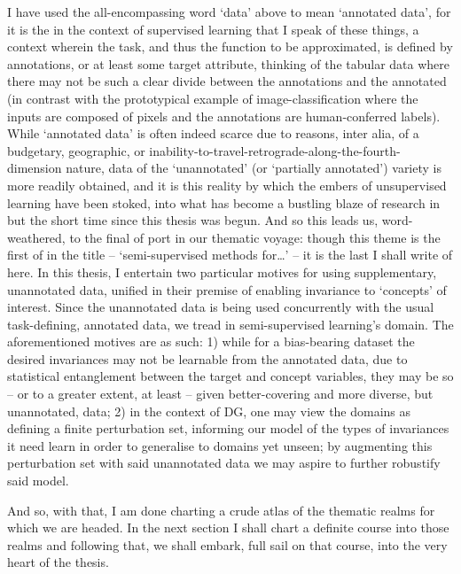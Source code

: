 %
%
I have used the all-encompassing word `data' above to mean `annotated data', for it is the in the
context of supervised learning that I speak of these things, a context wherein the task, and thus
the function to be approximated, is defined by annotations, or at least some target attribute,
thinking of the tabular data where there may not be such a clear divide between the annotations and
the annotated (in contrast with the prototypical example of image-classification where the inputs
are composed of pixels and the annotations are human-conferred labels).
%
While `annotated data' is often indeed scarce due to reasons, inter alia, of a budgetary,
geographic, or inability-to-travel-retrograde-along-the-fourth-dimension nature, data of the
`unannotated' (or `partially annotated') variety is more readily obtained, and it is this reality
by which the embers of unsupervised learning have been stoked, into what has become a bustling
blaze of research in but the short time since this thesis was begun.
%
And so this leads us, word-weathered, to the final of port in our thematic voyage: though this
theme is the first of in the title -- `semi-supervised methods for\dots' -- it is the last I shall
write of here.
%
In this thesis, I entertain two particular motives for using supplementary, unannotated data,
unified in their premise of enabling invariance to `concepts' of interest.
%
Since the unannotated data is being used concurrently with the usual task-defining, annotated data,
we tread in semi-supervised learning's domain.
%
The aforementioned motives are as such:
%
1) while for a bias-bearing dataset the desired invariances may not be learnable
from the annotated data, due to statistical entanglement between the target and concept variables,
they may be so -- or to a greater extent, at least -- given better-covering and more diverse, but
unannotated, data;
%
2) in the context of DG, one may view the domains as defining a finite perturbation set, informing
our model of the types of invariances it need learn in order to generalise to domains yet unseen;
by augmenting this perturbation set with said unannotated data we may aspire to further robustify
said model.

And so, with that, I am done charting a crude atlas of the thematic realms for which we are headed.
%
In the next section I shall chart a definite course into those realms and following that, we shall
embark, full sail on that course, into the very heart of the thesis.

